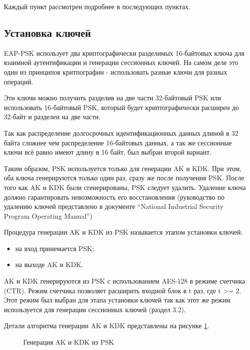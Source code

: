 Каждый пункт рассмотрен подробнее в последующих пунктах.

\subsection{Установка ключей}

EAP-PSK использует два криптографически разделимых 16-байтовых ключа для взаимной аутентификации и генерации сессионных ключей. На самом деле это один из принципов критпографии - использовать разные ключи для разных операций.

Эти ключи можно получить разделив на две части 32-байтовый PSK или использовать 16-байтовый PSK, который будет криптографически расширен до 32-байт и разделен на две части.

Так как распределение долгосрочных идентификационных данных длиной в 32 байта сложнее чем распределение 16-байтовых данных, а так же сессионные ключи всё равно имеют длину в 16 байт, был выбран второй вариант.

Таким образом, PSK используется только для генерации AK и KDK. При этом, оба ключа генерируются только один раз, сразу же после получения PSK. После того как AK и KDK были сгенерированы, PSK следует удалить. Удаление ключа должно гарантировать невозможность его восстановления (руководство по удалению ключей представлено в документе ``National Industrial Security Program Operating Manual'')

Процедура генерации AK и KDK из PSK называется этапом установки ключей:

\begin{itemize}
\item на вход принемается PSK;
\item на выходе AK и KDK.
\end{itemize}

AK и KDK генерируются из PSK с использованием AES-128 в режиме счетчика (CTR). Режим счетчика позволяет расширить входной блок в t раз, где t >= 2. Этот режим был выбран для этапа установки ключей так как этот же режим используется для генерации сессионных ключей (раздел 3.2).

Детали алгоритма генерации AK и KDK представлены на рисунке \ref{img:key_derivation}.

\begin{figure}[h!]
\caption{Генерация AK и KDK из PSK}
\label{img:key_derivation}
\end{figure}
